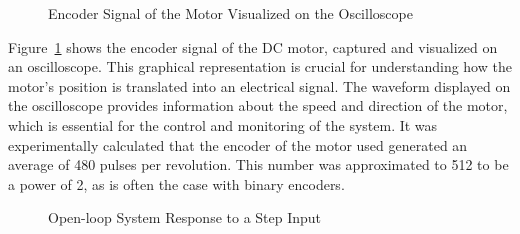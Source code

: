 \documentclass[conference,onecolumn]{IEEEtran}
\begin{document}
\begin{figure}[H]
    \centering
    \caption{Encoder Signal of the Motor Visualized on the Oscilloscope}
    \label{fig:encoder_signal}
\end{figure}

Figure~\ref{fig:encoder_signal} shows the encoder signal of the DC motor, captured and visualized on an oscilloscope. This graphical representation is crucial for understanding how the motor's position is translated into an electrical signal. The waveform displayed on the oscilloscope provides information about the speed and direction of the motor, which is essential for the control and monitoring of the system. It was experimentally calculated that the encoder of the motor used generated an average of 480 pulses per revolution. This number was approximated to 512 to be a power of 2, as is often the case with binary encoders.

\begin{figure}[H]
    \centering
    \caption{Open-loop System Response to a Step Input}
    \label{fig:open_loop_response}
\end{figure}
\end{document}
